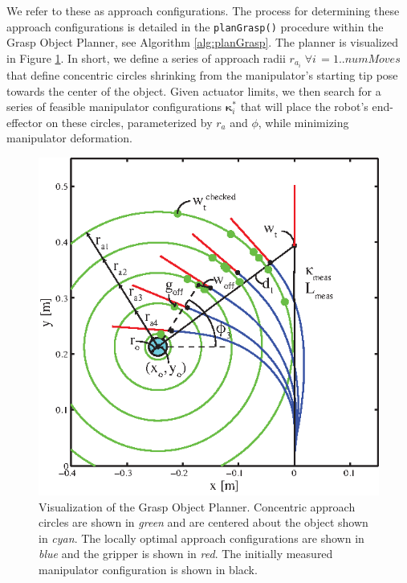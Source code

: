 We refer to these as approach configurations.
The process for determining these approach configurations is detailed in the \texttt{planGrasp()} procedure within the Grasp Object Planner, see Algorithm \ref{alg:planGrasp}.
The planner is visualized in Figure \ref{fig:planGrasp}.
In short, we define a series of approach radii $r_{a_i} \;  \forall i\, = 1.. numMoves$ that define concentric  circles shrinking from the manipulator's starting tip pose towards the center of the object.
Given actuator limits, we then search for a series of feasible manipulator configurations $\boldsymbol{\kappa}_i^*$ that will place the robot's end-effector on these  circles, parameterized by $r_a$ and $\phi$, while minimizing manipulator deformation.

\begin{figure}[htpb]
\centering
   \includegraphics[width=0.85\columnwidth, trim = 0mm 0mm 5mm 5mm, clip]{Figures/processing_control/grasp_object_planner.eps}
   \caption{Visualization of the Grasp Object Planner. Concentric approach circles are shown in \emph{green} and are centered about the object shown in \emph{cyan}. The locally optimal approach configurations are shown in \emph{blue} and the gripper is shown in \emph{red}. The initially measured manipulator configuration is shown in black.}
   \label{fig:planGrasp}
\end{figure}

